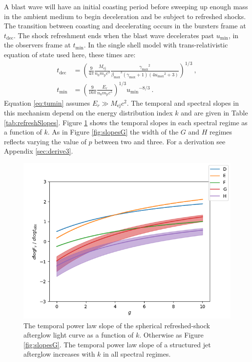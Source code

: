 \documentclass[twocolumn]{aastex62}
\newcommand{\Mej}{\ensuremath{M_{\mathrm{ej}}}}
\newcommand{\tdec}{\ensuremath{t_{\mathrm{dec}}}}
\newcommand{\tumin}{\ensuremath{t_{\mathrm{min}}}}
\newcommand{\Mp}{\ensuremath{m_{\mathrm{p}}}}
\newcommand{\umin}{\ensuremath{u_{\mathrm{min}}}}
\newcommand{\umax}{\ensuremath{u_{\mathrm{max}}}}
\newcommand{\gmax}{\ensuremath{\gamma_{\mathrm{max}}}}
\newcommand{\bmax}{\ensuremath{\beta_{\mathrm{max}}}}
\begin{document}
A blast wave will have an initial coasting period before sweeping up enough mass in the ambient medium to begin deceleration and be subject to refreshed shocks.  The transition between coasting and decelerating occurs in the bursters frame at $\tdec$. The shock refreshment ends when the blast wave decelerates past $\umin$, in the observers frame at $\tumin$.  In the single shell model with trans-relativistic equation of state used here, these times are:
\begin{align}
	\tdec &= \left(\frac{9}{4\pi} \frac{\Mej}{n_0 \Mp c^3} \frac{\gmax^2}{\bmax^3(\gmax+1)(4\umax^2+3)} \right)^{1/3}  \ ,\label{eq:tdec} \\
	\tumin &= \left(\frac{9}{16\pi} \frac{E_r}{n_0 \Mp c^5}\right)^{1/3} \umin^{-8/3} \ .\label{eq:tumin}
\end{align}
Equation \eqref{eq:tumin} assumes $E_r \gg \Mej c^2$.   The temporal and spectral slopes in this mechanism depend on the energy distribution index $k$ and are given in Table \ref{tab:refreshSlopes}.  Figure \ref{fig:slopesK} shows the temporal slopes in each spectral regime as a function of $k$.  As in Figure \ref{fig:slopesG} the width of the $G$ and $H$ regimes reflects varying the value of $p$ between two and three.  For a derivation see Appendix \ref{sec:derive3}.  


%
%


\begin{figure}
	\includegraphics[width=\columnwidth]{figs/slopesCocoon.png}
	\caption{The temporal power law slope of the spherical refreshed-shock afterglow light curve as a function of $k$.  Otherwise as Figure \ref{fig:slopesG}.  The temporal power law slope of a structured jet afterglow increases with $k$ in all spectral regimes. \label{fig:slopesK}}
\end{figure}
\end{document}
